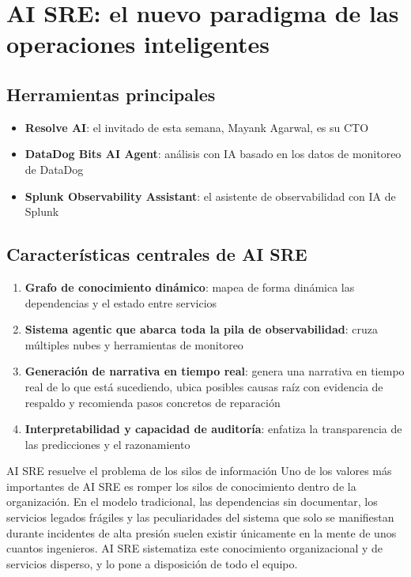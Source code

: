 \section{AI SRE: el nuevo paradigma de las operaciones inteligentes}

\subsection{Herramientas principales}

\begin{itemize}
    \item \textbf{Resolve AI}: el invitado de esta semana, Mayank Agarwal, es su CTO
    \item \textbf{DataDog Bits AI Agent}: análisis con IA basado en los datos de monitoreo de DataDog
    \item \textbf{Splunk Observability Assistant}: el asistente de observabilidad con IA de Splunk
\end{itemize}

\subsection{Características centrales de AI SRE}

\begin{enumerate}
    \item \textbf{Grafo de conocimiento dinámico}: mapea de forma dinámica las dependencias y el estado entre servicios
    \item \textbf{Sistema agentic que abarca toda la pila de observabilidad}: cruza múltiples nubes y herramientas de monitoreo
    \item \textbf{Generación de narrativa en tiempo real}: genera una narrativa en tiempo real de lo que está sucediendo, ubica posibles causas raíz con evidencia de respaldo y recomienda pasos concretos de reparación
    \item \textbf{Interpretabilidad y capacidad de auditoría}: enfatiza la transparencia de las predicciones y el razonamiento
\end{enumerate}

\begin{knowledgebox}{AI SRE resuelve el problema de los silos de información}
Uno de los valores más importantes de AI SRE es romper los silos de conocimiento dentro de la organización. En el modelo tradicional, las dependencias sin documentar, los servicios legados frágiles y las peculiaridades del sistema que solo se manifiestan durante incidentes de alta presión suelen existir únicamente en la mente de unos cuantos ingenieros. AI SRE sistematiza este conocimiento organizacional y de servicios disperso, y lo pone a disposición de todo el equipo.
\end{knowledgebox}

